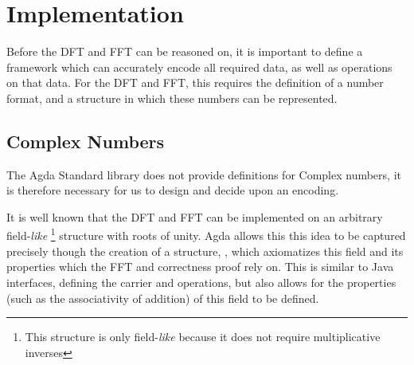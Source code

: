 \section{Implementation}

Before the DFT and FFT can be reasoned on, it is important to define a 
framework which can accurately encode all required data, as well as 
operations on that data. 
For the DFT and FFT, this requires the definition of a number format, and a
structure in which these numbers can be represented.


\subsection{Complex Numbers}
\label{sec:complex_numbers}

The Agda Standard library does not provide definitions for Complex numbers, it
is therefore necessary for us to design and decide upon an encoding.

It is well known \cite{TheDFT}
that the DFT and FFT can be implemented on an arbitrary field-\textit{like}
\footnote{This structure is only field-\textit{like} because it does not require multiplicative inverses}
structure with roots of unity.
Agda allows this this idea to be captured precisely though the creation of a
structure, , which axiomatizes this field and its properties which the FFT
and correctness proof rely on.
This is similar to Java interfaces, defining the carrier and operations, but also
allows for the properties (such as the associativity of addition) of this field to 
be defined.

